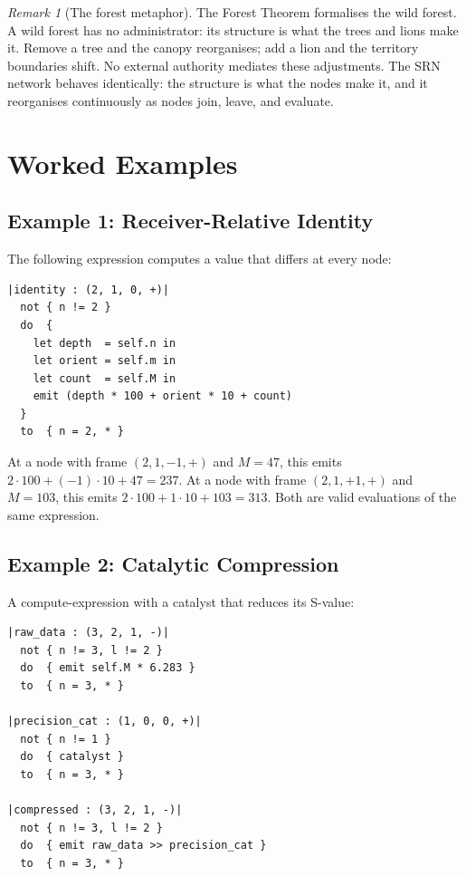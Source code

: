 \documentclass[twocolumn,11pt,a4paper]{article}
\theoremstyle{definition}
\theoremstyle{remark}
\newtheorem{remark}[theorem]{Remark}
\begin{document}
\begin{remark}[The forest metaphor]
The Forest Theorem formalises the wild forest.  A wild forest has no
administrator: its structure is what the trees and lions make it.
Remove a tree and the canopy reorganises; add a lion and the territory
boundaries shift.  No external authority mediates these adjustments.
The SRN network behaves identically: the structure is what the nodes
make it, and it reorganises continuously as nodes join, leave, and
evaluate.
\end{remark}

\section{Worked Examples}
\label{sec:examples}

\subsection{Example 1: Receiver-Relative Identity}

The following expression computes a value that differs at every node:

\begin{lstlisting}[caption={Receiver-relative value}, label={lst:ex1}]
|identity : (2, 1, 0, +)|
  not { n != 2 }
  do  {
    let depth  = self.n in
    let orient = self.m in
    let count  = self.M in
    emit (depth * 100 + orient * 10 + count)
  }
  to  { n = 2, * }
\end{lstlisting}

At a node with frame $(2, 1, -1, +)$ and $M = 47$, this emits
$2 \cdot 100 + (-1) \cdot 10 + 47 = 237$.
At a node with frame $(2, 1, +1, +)$ and $M = 103$, this emits
$2 \cdot 100 + 1 \cdot 10 + 103 = 313$.
Both are valid evaluations of the same expression.

\subsection{Example 2: Catalytic Compression}

A compute-expression with a catalyst that reduces its S-value:

\begin{lstlisting}[caption={Catalytic compression}, label={lst:ex2}]
|raw_data : (3, 2, 1, -)|
  not { n != 3, l != 2 }
  do  { emit self.M * 6.283 }
  to  { n = 3, * }

|precision_cat : (1, 0, 0, +)|
  not { n != 1 }
  do  { catalyst }
  to  { n = 3, * }

|compressed : (3, 2, 1, -)|
  not { n != 3, l != 2 }
  do  { emit raw_data >> precision_cat }
  to  { n = 3, * }
\end{lstlisting}
\end{document}
